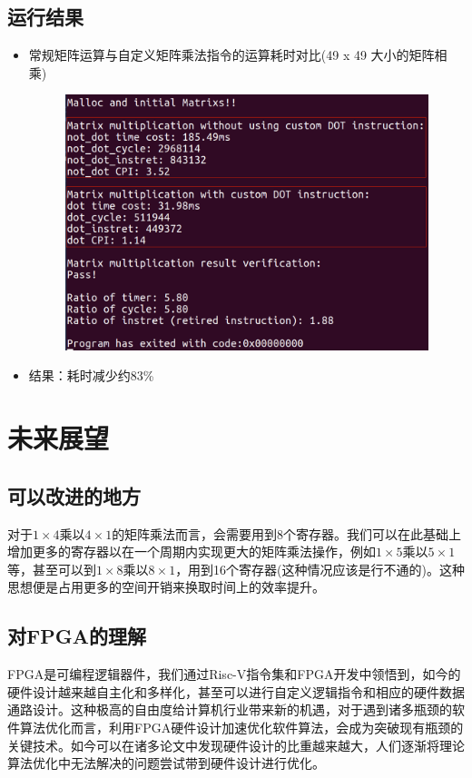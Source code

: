 \documentclass[a4paper, 14pt, oneside]{book} %
\numberwithin{equation}{subsection}
\begin{document}
	\subsection{运行结果}
		\begin{itemize}
			\item 
				常规矩阵运算与自定义矩阵乘法指令的运算耗时对比(49 x 49 大小的矩阵相乘)
				\begin{figure}[H]
					\centering
					\includegraphics[scale=0.4]{img/result.png}
				\end{figure}
			\item 
				结果：耗时减少约83\%
		\end{itemize}

	\section{未来展望}
	\subsection{可以改进的地方}
	对于$1\times4$乘以$4\times1$的矩阵乘法而言，会需要用到8个寄存器。我们可以在此基础上增加更多的寄存器以在一个周期内实现更大的矩阵乘法操作，例如$1\times5$乘以$5\times1$等，甚至可以到$1\times8$乘以$8\times1$，用到16个寄存器(这种情况应该是行不通的)。这种思想便是占用更多的空间开销来换取时间上的效率提升。
	
	\subsection{对FPGA的理解}
	FPGA是可编程逻辑器件，我们通过Risc-V指令集和FPGA开发中领悟到，如今的硬件设计越来越自主化和多样化，甚至可以进行自定义逻辑指令和相应的硬件数据通路设计。这种极高的自由度给计算机行业带来新的机遇，对于遇到诸多瓶颈的软件算法优化而言，利用FPGA硬件设计加速优化软件算法，会成为突破现有瓶颈的关键技术。如今可以在诸多论文中发现硬件设计的比重越来越大，人们逐渐将理论算法优化中无法解决的问题尝试带到硬件设计进行优化。
	
	
\end{document}
